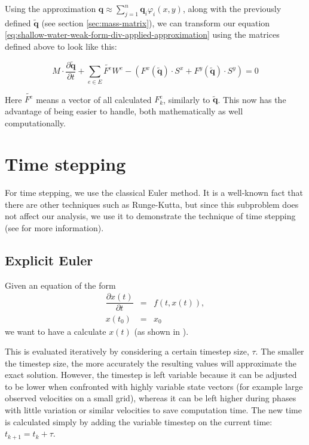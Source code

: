\documentclass{article}
\newcommand{\pd}[2]{\dfrac{\partial #1}{\partial #2}}
\renewcommand{\phi}{\varphi}
\begin{document}
Using the approximation $\mathbf{q} \approx \sum_{j=1}^n \mathbf{q}_i \phi_i\left(x,y\right)$, along with the previously defined $\tilde{\mathbf{q}}$ (see section \ref{sec:mass-matrix}), we can transform our equation \ref{eq:shallow-water-weak-form-div-applied-approximation} using the matrices defined above to look like this:

\begin{equation}
  \label{eq:swe-matrix-form}
  M \cdot \pd{\tilde{\mathbf{q}}}{t} +
  \sum_{e \in E} \tilde{F^e} W^e -
  \left(F^x(\tilde{\mathbf{q}}) \cdot S^x +
    F^y(\tilde{\mathbf{q}}) \cdot S^y\right) = 0
\end{equation}

Here $\tilde{F^e}$ means a vector of all calculated $F_k^e$, similarly to $\tilde{\mathbf{q}}$. This now has the advantage of being easier to handle, both mathematically as well computationally.

\section{Time stepping}
\label{sec:computing-integrals}

For time stepping, we use the classical Euler method. It is a well-known fact that there are other techniques such as Runge-Kutta, but since this subproblem does not affect our analysis, we use it to demonstrate the technique of time stepping (see \cite{hans2009schwarz} for more information).

\subsection{Explicit Euler}
\label{subsec:explicit-euler}

Given an equation of the form
\begin{eqnarray}
  \label{eq:euler-method-setting}
  \pd{x(t)}{t} & = & f(t, x(t)), \\
  x(t_0) & = & x_0
\end{eqnarray}
we want to have a calculate $x(t)$ (as shown in \cite{schwaiger08adaptive}).

This is evaluated iteratively by considering a certain timestep size, $\tau$. The smaller the timestep size, the more accurately the resulting values will approximate the exact solution. However, the timestep is left variable because it can be adjusted to be lower when confronted with highly variable state vectors (for example large observed velocities on a small grid), whereas it can be left higher during phases with little variation or similar velocities to save computation time. The new time is calculated simply by adding the variable timestep on the current time: $t_{k+1} = t_k + \tau$.
\end{document}
